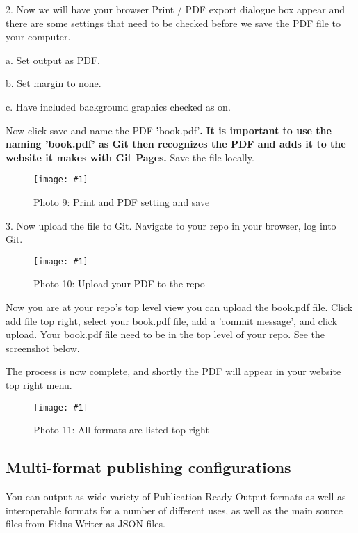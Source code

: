 \documentclass{article}
\newlength{\imgwidth}
\newcommand\scaledgraphics[2]{%
                
\settowidth{\imgwidth}{\texttt{[image: \#1]}}%
                
\setlength{\imgwidth}{\minof{\imgwidth}{#2\textwidth}}%
                
\texttt{[image: \#1]}%
                
}
\begin{document}
2. Now we will have your browser Print / PDF export dialogue box appear and there are some settings that need to be checked before we save the PDF file to your computer. 


a. Set output as PDF.


b. Set margin to none.


c. Have included background graphics checked as on.


Now click save and name the PDF \textbf{'}book.pdf'\textbf{.} \textbf{It is important to use the naming 'book.pdf' as Git then recognizes the PDF and adds it to the website it makes with Git Pages.} Save the file locally.

\begin{figure}
\scaledgraphics{178f3e82-a78a-4cdc-a6d6-9df4385477b6.png}{1}
\caption*{Photo 9: Print and PDF setting and save }\label{F15890551}
\end{figure}


3. Now upload the file to Git. Navigate to your repo in your browser, log into Git.

\begin{figure}
\scaledgraphics{3568f67f-6fc0-43b4-9cc5-adc109b4f9e6.png}{1}
\caption*{Photo 10: Upload your PDF to the repo}\label{F99448091}
\end{figure}


Now you are at your repo's top level view you can upload the book.pdf file. Click add file top right, select your book.pdf file, add a 'commit message', and click upload. Your book.pdf file need to be in the top level of your repo. See the screenshot below.


The process is now complete, and shortly the PDF will appear in your website top right menu.

\begin{figure}
\scaledgraphics{8b26a358-6fdd-41c6-91aa-2a1fbbf977cc.png}{1}
\caption*{Photo 11: All formats are listed top right}\label{F60935641}
\end{figure}


\subsection{Multi-format publishing configurations}\label{H6290333}



You can output as wide variety of Publication Ready Output formats as well as interoperable formats for a number of different uses, as well as the main source files from Fidus Writer as JSON files.
\end{document}
